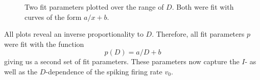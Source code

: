 \documentclass[12pt,a4paper]{article}
\begin{document}
\begin{figure}[H]
	\hspace*{-0.5cm}
	\caption{Two fit parameters plotted over the range of $D$. Both were fit with curves of the form $a/x+b$.}
\end{figure}  
All plots reveal an inverse proportionality to $D$. Therefore, all fit parameters $p$ were fit with the function
\begin{equation}
p(D)=a/D+b
\end{equation}
giving us a second set of fit parameters. These parameters now capture the $I$- as well as the $D$-dependence of the spiking firing rate $v_0$.
\end{document}
